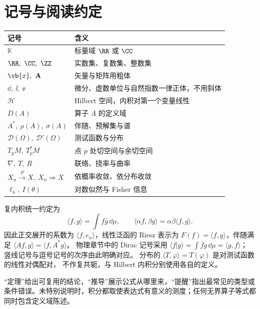 \chapter*{记号与阅读约定}

\begin{center}
\begin{tabular}{ll}
\toprule
记号 & 含义\\
\midrule
$\mathbb K$ & 标量域 $\RR$ 或 $\CC$\\
$\RR,\ \CC,\ \ZZ$ & 实数集、复数集、整数集\\
$\vb{x},\ \mathbf{A}$ & 矢量与矩阵用粗体\\
$\dd,\ \ii,\ \ee$ & 微分、虚数单位与自然指数一律正体，不用斜体\\
$\mathcal H$ & Hilbert 空间，内积对第一个变量线性\\
$D(A)$ & 算子 $A$ 的定义域\\
$A^*,\ \rho(A),\ \sigma(A)$ & 伴随、预解集与谱\\
$\mathcal D(\Omega),\ \mathcal D'(\Omega)$ & 测试函数与分布\\
$T_pM,\ T_p^*M$ & 点 $p$ 处切空间与余切空间\\
$\nabla,\ T,\ R$ & 联络、挠率与曲率\\
$X_n\xrightarrow{P}X,\ X_n\Rightarrow X$ & 依概率收敛、依分布收敛\\
$\ell_n,\ I(\theta)$ & 对数似然与 Fisher 信息\\
\bottomrule
\end{tabular}
\end{center}

复内积统一约定为
\[
\langle f,g\rangle=\int f\overline g\,\dd\mu,
\qquad
\langle\alpha f,\beta g\rangle
=\alpha\overline\beta\langle f,g\rangle.
\]
因此正交展开的系数为 $\langle f,e_n\rangle$，线性泛函的 Riesz 表示为
$F(f)=\langle f,y\rangle$，伴随满足
$\langle Af,g\rangle=\langle f,A^*g\rangle$。
物理章节中的 Dirac 记号采用
$\langle f|g\rangle=\int\overline f g\,\dd\mu=\langle g,f\rangle$；
竖线记号与逗号记号的次序由此明确对应。
分布的 $\langle T,\varphi\rangle=T(\varphi)$ 是对测试函数的线性对偶配对，
不作复共轭，与 Hilbert 内积分别使用各自的定义。

“定理”给出可复用的结论，“推导”展示公式从哪里来，“提醒”指出最常见的类型或条件错误。未特别说明时，积分都取使表达式有意义的测度；任何无界算子等式都同时包含定义域陈述。
